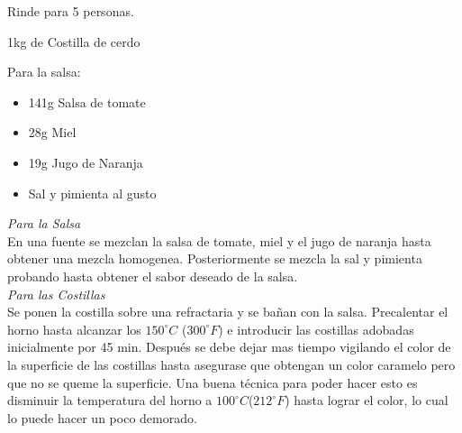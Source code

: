 
Rinde para 5 personas.


\begin{ingredientes}
\item 1kg de Costilla de cerdo
\item Para la salsa:
\begin{itemize}
\item 141g Salsa de tomate
\item 28g Miel
\item 19g Jugo de Naranja
\item Sal y pimienta al gusto
\end{itemize}
\end{ingredientes}
\preparacion

\emph{Para la Salsa}\\

En una fuente se mezclan la salsa de tomate, miel y el jugo de naranja hasta obtener una mezcla homogenea. Posteriormente se mezcla la sal y pimienta probando hasta obtener el sabor deseado de la salsa.\\

\emph{Para las Costillas}\\

Se ponen la costilla sobre una refractaria y se bañan con la salsa. Precalentar el horno hasta alcanzar los $150^{\circ}C$ ($300^{\circ}F$) e introducir las costillas adobadas inicialmente por 45 min. Después se debe dejar mas tiempo vigilando el color de la superficie de las costillas hasta asegurase que obtengan un color caramelo pero que no se queme la superficie. Una buena técnica para poder hacer esto es disminuir la temperatura del horno a $100^{\circ}C$($212^{\circ}F$) hasta lograr el color, lo cual lo puede hacer un poco demorado.\\
